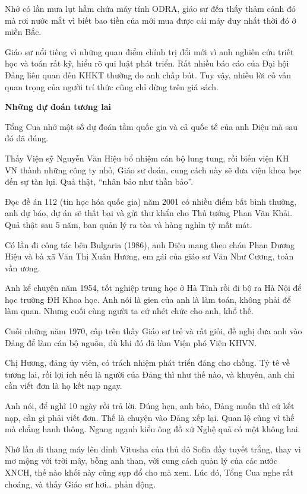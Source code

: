 Nhớ có lần mưa lụt hầm chứa máy tính ODRA, giáo sư đến thấy thảm cảnh đó mà rơi nước mắt vì biết bao tiền của mới mua được cái máy duy nhất thời đó ở miền Bắc.

Giáo sư nổi tiếng vì những quan điểm chính trị đổi mới vì anh nghiên cứu triết học và toán rất kỹ, hiểu rõ qui luật phát triển. Rất nhiều báo cáo của Đại hội Đảng liên quan đến KHKT thường do anh chấp bút. Tuy vậy, nhiều lời cố vấn quan trọng của người trí thức cũng chỉ dừng trên giá sách.

\begin{center}
\textbf{Những dự đoán tương lai}
\end{center}

Tổng Cua nhớ một số dự đoán tầm quốc gia và cả quốc tế của anh Diệu mà sau đó đã đúng.

Thấy Viện sỹ Nguyễn Văn Hiệu bổ nhiệm cán bộ lung tung, rồi biến viện KH VN thành những công ty nhỏ, Giáo sư đoán, cung cách này sẽ đưa viện khoa học đến sự tàn lụi. Quả thật, “nhân bảo như thần bảo”.

Đọc đề án 112 (tin học hóa quốc gia) năm 2001 có nhiều điểm bất bình thường, anh dự báo, dự án sẽ thất bại và gửi thư khẩn cho Thủ tướng Phan Văn Khải. Quả thật sau 5 năm, ban quản lý ra tòa và hàng nghìn tỷ mất mát.

Có lần đi công tác bên Bulgaria (1986), anh Diệu mang theo cháu Phan Dương Hiệu và bà xã Văn Thị Xuân Hương, em gái của giáo sư Văn Như Cương, toàn vần ương.

Anh kể chuyện năm 1954, tốt nghiệp trung học ở Hà Tĩnh rồi đi bộ ra Hà Nội để học trường ĐH Khoa học. Anh nói là gien của anh là làm toán, không phải để làm quan. Nhưng cuối cùng người ta cứ nhét chức cho anh, khổ thế.

Cuối những năm 1970, cấp trên thấy Giáo sư trẻ và rất giỏi, đề nghị đưa anh vào Đảng để làm cán bộ nguồn, dù khi đó đã làm Viện phó Viện KHVN.

Chị Hương, đảng ủy viên, có trách nhiệm phát triển đảng cho chồng. Tỷ tê về tương lai, rồi lợi ích nếu là người của Đảng thì như thế nào, và khuyên, anh chỉ cần viết đơn là họ kết nạp ngay.

Anh nói, để nghĩ 10 ngày rồi trả lời. Đúng hẹn, anh bảo, Đảng muốn thì cứ kết nạp, cần gì phải viết đơn. Thế là chuyện vào Đảng xếp lại. Quan lộ cũng vì thế mà chẳng hanh thông. Ngang ngạnh kiểu ông đồ xứ Nghệ quả có một không hai.

Nhớ lần đi thang máy lên đỉnh Vitusha của thủ đô Sofia đầy tuyết trắng, thay vì mơ mộng với trời mây, bỗng anh than, với cung cách quản lý của các nước XNCH, thế nào khối này cũng sụp đổ cho mà xem. Lúc đó, Tổng Cua nghe rất choáng, và thấy Giáo sư hơi… phản động.

